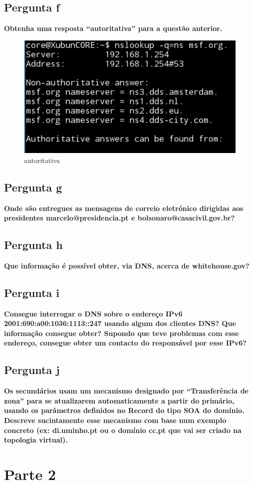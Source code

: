 \documentclass[a4paper]{report}
\begin{document}
\section{Pergunta f}
\textbf{Obtenha uma resposta “autoritativa” para a questão anterior.}
\begin{figure}[H]
    \centering 
    \includegraphics[width=\textwidth]{images/autoritativa.png}  
    \caption{autoritativa}
    \label{fig:autoritativa}
\end{figure}

\section{Pergunta g}
\textbf{Onde são entregues as mensagens de correio eletrónico dirigidas aos
presidentes marcelo@presidencia.pt e bolsonaro@casacivil.gov.br?}

\section{Pergunta h}
\textbf{Que informação é possível obter, via DNS, acerca de whitehouse.gov?}

\section{Pergunta i}
\textbf{Consegue interrogar o DNS sobre o endereço IPv6
2001:690:a00:1036:1113::247 usando algum dos clientes DNS? Que informação
consegue obter? Supondo que teve problemas com esse endereço, consegue obter um
contacto do responsável por esse IPv6?}

\section{Pergunta j}
\textbf{Os secundários usam um mecanismo designado por “Transferência de zona”
para se atualizarem automaticamente a partir do primário, usando os parâmetros
definidos no Record do tipo SOA do domínio. Descreve sucintamente esse mecanismo
com base num exemplo concreto (ex: di.uminho.pt ou o domínio cc.pt que vai ser
criado na topologia virtual).}

\chapter{Parte 2}
\end{document}
